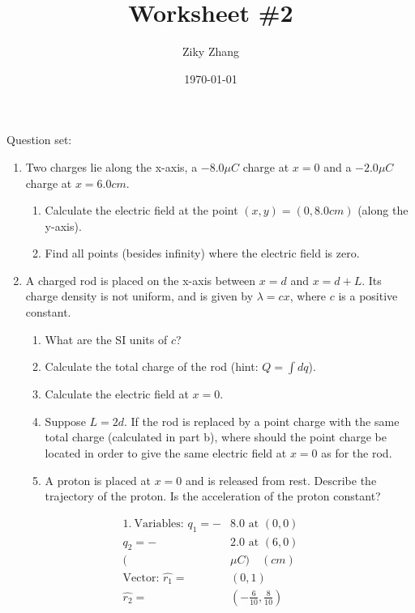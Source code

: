 \documentclass[11pt]{article}
\author{Ziky Zhang}
\date{\today}
\title{Worksheet \#2}
\begin{document}
\maketitle
\newpage
Question set:
\begin{enumerate}
\item Two charges lie along the x-axis, a \(-8.0 \mu C\) charge at \(x=0\) and a \(-2.0 \mu C\) charge at \(x=6.0cm\).
\begin{enumerate}
\item Calculate the electric field at the point \((x, y)=(0, 8.0cm)\) (along the y-axis).
\item Find all points (besides infinity) where the electric field is zero.
\end{enumerate}
\item A charged rod is placed on the x-axis between \(x=d\) and \(x=d+L\). Its charge density is not uniform, and is given by \(\lambda=cx\), where \(c\) is a positive constant.
\begin{enumerate}
\item What are the SI units of \(c\)?
\item Calculate the total charge of the rod (hint: \(Q= \int dq\)).
\item Calculate the electric field at \(x=0\).
\item Suppose \(L=2d\). If the rod is replaced by a point charge with the same total charge (calculated in part b), where should the point charge be located in order to give the same electric field at \(x=0\) as for the rod.
\item A proton is placed at \(x=0\) and is released from rest. Describe the trajectory of the proton. Is the acceleration of the proton constant?
\end{enumerate}
\end{enumerate}

\begin{align*}
1. \ 
\text{Variables: }
q_{1} = -&8.0 \text{ at } (0,0) \\
q_{2} = -&2.0 \text{ at } (6,0) \\
        (&\mu C) \quad (cm) \\
\text{Vector: }
\hat{r_{1}} = &(0, 1) \\
\hat{r_{2}} = &(-\frac{6}{10}, \frac{8}{10})
\end{align*}
\end{document}
